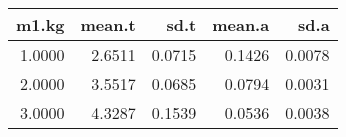 \begin{table}[ht]
\centering
\begin{tabular}{rrrrr}
  \hline
m1.kg & mean.t & sd.t & mean.a & sd.a \\ 
  \hline
1.0000 & 2.6511 & 0.0715 & 0.1426 & 0.0078 \\ 
  2.0000 & 3.5517 & 0.0685 & 0.0794 & 0.0031 \\ 
  3.0000 & 4.3287 & 0.1539 & 0.0536 & 0.0038 \\ 
   \hline
\end{tabular}
\end{table}
